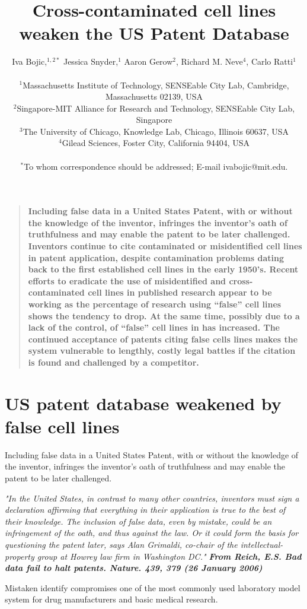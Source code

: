 \documentclass[12pt]{article}
\title{Cross-contaminated cell lines weaken the US Patent Database}
\author
{Iva Bojic,$^{1,2\ast}$ Jessica Snyder,$^{1}$ Aaron Gerow$^{2}$, Richard M. Neve$^{4}$, Carlo Ratti$^{1}$ \\
\\
\normalsize{$^{1}$Massachusetts Institute of Technology, SENSEable City Lab, Cambridge, Massachusetts 02139, USA}\\
\normalsize{$^{2}$Singapore-MIT Alliance for Research and Technology, SENSEable City Lab, Singapore}\\
\normalsize{$^{3}$The University of Chicago, Knowledge Lab, Chicago, Illinois 60637, USA}\\
\normalsize{$^{4}$Gilead Sciences, Foster City, California 94404, USA}\\
\\
\normalsize{$^\ast$To whom correspondence should be addressed; E-mail ivabojic@mit.edu.}
}
\newenvironment{sciabstract}{%
\begin{quote} \bf}
{\end{quote}}
\begin{document}
 

\baselineskip24pt
\maketitle 

\begin{sciabstract}
Including false data in a United States Patent, with or without the knowledge of the inventor, infringes the inventor's oath of truthfulness and may enable the patent to be later challenged. Inventors continue to cite contaminated or misidentified cell lines in patent application, despite contamination problems dating back to the first established cell lines in the early 1950's. Recent efforts to eradicate the use of misidentified and cross-contaminated cell lines in published research appear to be working as the percentage of research using ``false'' cell lines shows the tendency to drop. At the same time, possibly due to a lack of the control,  of ``false'' cell lines in  has increased. The continued acceptance of patents citing false cells lines makes the system vulnerable to lengthly, costly legal battles if the citation is found and challenged by a competitor. 
\end{sciabstract}

 \newpage

\section*{US patent database weakened by false cell lines}
Including false data in a United States Patent, with or without the knowledge of the inventor, infringes the inventor's oath of truthfulness and may enable the patent to be later challenged.

\textit{"In the United States, in contrast to many other countries, inventors must sign a declaration affirming that everything in their application is true to the best of their knowledge. The inclusion of false data, even by mistake, could be an infringement of the oath, and thus against the law. Or it could form the basis for questioning the patent later, says Alan Grimaldi, co-chair of the intellectual-property group at Howrey law firm in Washington DC."  \textbf{From Reich, E.S. Bad data fail to halt patents. Nature. 439, 379 (26 January 2006) }}

Mistaken identify compromises one of the most commonly used laboratory model system for drug manufacturers and basic medical research.
\end{document}
